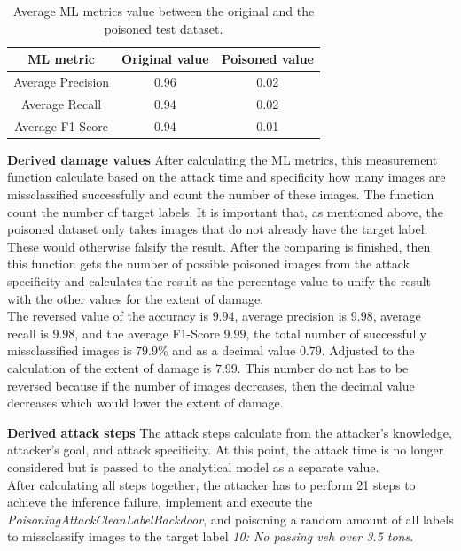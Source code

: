 \begin{table}[ht!]
  \centering
  \begin{tabular}{| c | c | c |}
  \hline
  \rowcolor{lightgray} ML metric & Original value & Poisoned value \\ [0.5ex]
  \hline
  Average Precision & 0.96 & 0.02 \\
  \hline
  Average Recall & 0.94 & 0.02 \\
  \hline
  Average F1-Score & 0.94 & 0.01 \\
  \hline
  \end{tabular}
  \caption{Average ML metrics value between the original and the poisoned test dataset.}
  \label{tab:ml_metrics}
\end{table}

\noindent\textbf{Derived damage values} After calculating the ML metrics, this measurement function calculate based on the attack time and specificity how many images are missclassified successfully and count the number of these images. The function count the number of target labels. It is important that, as mentioned above, the poisoned dataset only takes images that do not already have the target label. These would otherwise falsify the result. After the comparing is finished, then this function gets the number of possible poisoned images from the attack specificity and calculates the result as the percentage value to unify the result with the other values for the extent of damage. \\
The reversed value of the accuracy is $9.94$, average precision is $9.98$, average recall is $9.98$, and the average F1-Score $9.99$, the total number of successfully missclassified images is $79.9\%$ and as a decimal value $0.79$. Adjusted to the calculation of the extent of damage is $7.99$. This number do not has to be reversed because if the number of images decreases, then the decimal value decreases which would lower the extent of damage.

\noindent\textbf{Derived attack steps} The attack steps calculate from the attacker's knowledge, attacker's goal, and attack specificity. At this point, the attack time is no longer considered but is passed to the analytical model as a separate value. \\
After calculating all steps together, the attacker has to perform 21 steps to achieve the inference failure, implement and execute the \textit{PoisoningAttackCleanLabelBackdoor}, and poisoning a random amount of all labels to missclassify images to the target label \textit{10: No passing veh over 3.5 tons}.

